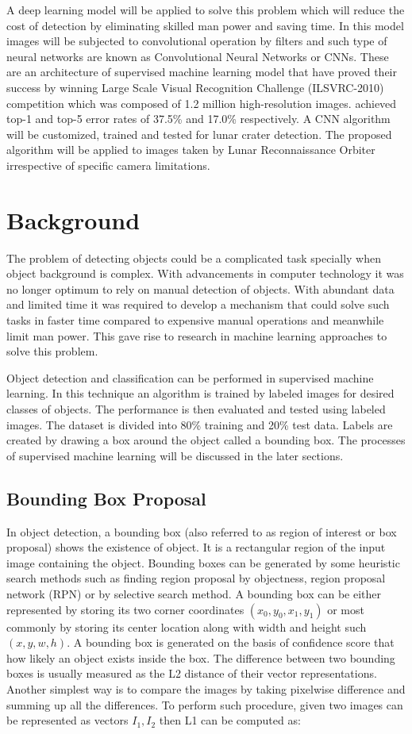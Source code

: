 \documentclass[11pt]{article}
\begin{document}
A deep learning model will be applied to solve this problem which will reduce the cost of detection by eliminating skilled man power and saving time. In this model images will be subjected to convolutional operation by filters and such type of neural networks are known as Convolutional Neural Networks or CNNs. These are an architecture of supervised machine learning model that have proved their success by winning Large Scale Visual Recognition Challenge (ILSVRC-2010) competition which was composed of 1.2 million high-resolution images. \cite{krizhevsky_imagenet_2012} achieved top-1 and top-5 error rates of 37.5\% and 17.0\% respectively. A CNN algorithm will be customized, trained and tested for lunar crater detection. The proposed algorithm will be applied to images taken by Lunar Reconnaissance Orbiter irrespective of specific camera limitations.

\section{Background}
The problem of detecting objects could be a complicated task specially when object background is complex. With advancements in computer technology it was no longer optimum to rely on manual detection of objects. With abundant data and limited time it was required to develop a mechanism that could solve such tasks in faster time compared to expensive manual operations and meanwhile limit man power. This gave rise to research in machine learning approaches to solve this problem.

Object detection and classification can be performed in supervised machine learning. In this technique an algorithm is trained by labeled images for desired classes of objects. The performance is then evaluated and tested using labeled images. The dataset is divided into 80\% training and 20\% test data. Labels are created by drawing a box around the object called a bounding box. The processes of supervised machine learning will be discussed in the later sections.
  

\subsection{Bounding Box Proposal}
In object detection, a bounding box (also referred to as region of interest or box proposal) shows the existence of object. It is a rectangular region of the input image containing the object. Bounding boxes can be generated by some heuristic search methods such as finding region proposal by objectness, region proposal network (RPN) or by selective search method.
A bounding box can be either represented by storing its two corner coordinates $(x_0, y_0, x_1, y_1 )$  or most commonly by storing its center location along  with width and height such $(x, y, w, h)$. A bounding box is generated on the basis of confidence score that how likely an object exists inside the box. The difference between two bounding boxes is usually measured as the L2 distance of their vector representations. Another simplest way is to compare the images by taking pixelwise difference and summing up all the differences. To perform such procedure, given two images can be represented as vectors $I_1, I_2$ then L1 can be computed as:
\end{document}
